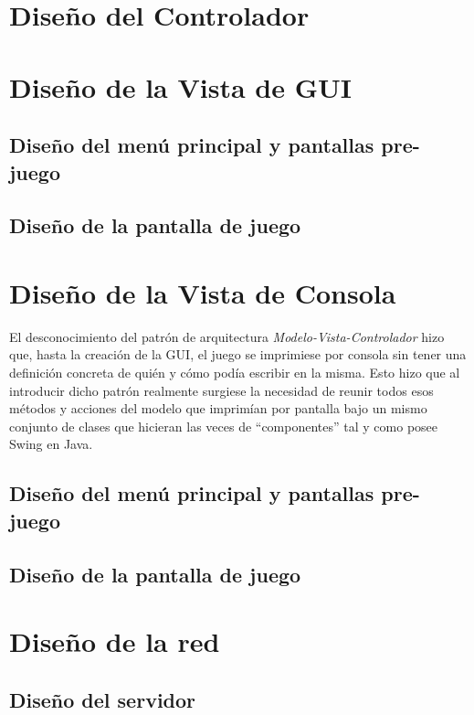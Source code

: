 \documentclass{article}
\theoremstyle{break}
\begin{document}
\section{Diseño del Controlador}


\section{Diseño de la Vista de GUI}

\subsection{Diseño del menú principal y pantallas pre-juego}

\subsection{Diseño de la pantalla de juego}


\section{Diseño de la Vista de Consola}
El desconocimiento del patrón de arquitectura \textit{Modelo-Vista-Controlador} hizo que, hasta la creación de la GUI, el juego se imprimiese por consola sin tener una definición concreta de quién y cómo podía escribir en la misma. Esto hizo que al introducir dicho patrón realmente surgiese la necesidad de reunir todos esos métodos y acciones del modelo que imprimían por pantalla bajo un mismo conjunto de clases que hicieran las veces de ``componentes'' tal y como posee Swing en Java.

\subsection{Diseño del menú principal y pantallas pre-juego}

\subsection{Diseño de la pantalla de juego}


\section{Diseño de la red}

\subsection{Diseño del servidor}
\end{document}
